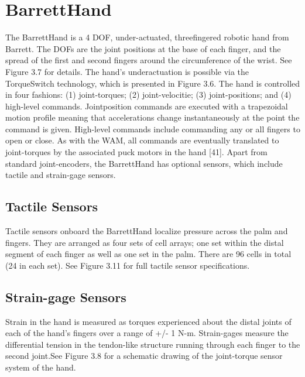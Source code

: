 \section{BarrettHand} 

The BarrettHand is a 4 DOF, under-actuated, threefingered robotic hand from Barrett.
The DOFs are the joint positions at the base of each finger, and the spread of the first and second fingers around the circumference of the wrist.
See Figure 3.7 for details. 
The hand’s underactuation is possible via the TorqueSwitch technology, which is presented in Figure 3.6.
The hand is controlled in four fashions: (1) joint-torques; (2) joint-velocitie; (3)
joint-positions; and (4) high-level commands.
Jointposition commands are executed with a trapezoidal motion profile meaning that accelerations change instantaneously at the point the command is given.
High-level commands include commanding any or all fingers to open or close.
As with the WAM, all commands are eventually translated to joint-torques by the associated puck motors in the hand [41].
Apart from standard joint-encoders, the BarrettHand has optional sensors, which include tactile and strain-gage sensors.

\subsection{Tactile Sensors} 

Tactile sensors onboard the BarrettHand localize pressure across the palm and fingers.
They are arranged as four sets of cell arrays; one set within the distal segment of each finger as well as one set in the palm.
There are 96 cells in total (24 in each set).
See Figure 3.11 for full tactile sensor specifications.

\subsection{Strain-gage Sensors} 

Strain in the hand is measured as torques experienced about the distal joints of each of the hand’s fingers over a range of +/- 1 N-m.
Strain-gages measure the differential tension in the tendon-like structure running through each finger to the second joint.See Figure 3.8 for a schematic drawing of the joint-torque sensor system of the hand.
